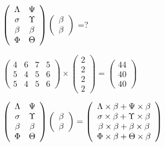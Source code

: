 \documentclass[12pt]{article}
\begin{document}
 
$  %
 \left( \begin{array}
 {
 c
 c
 }
 \Lambda & 
 \Psi \\ 
 \sigma & 
 \Upsilon \\ 
 \beta & 
 \beta \\ 
 \Phi & 
 \Theta
 \end{array} \right)
 \left( \begin{array}
 {
 c
 }
 \beta \\ 
 \beta
 \end{array} \right)
$ =?
 
 
 
\noindent{}
 
 

 
$\left( \begin{array}{ccccccccccccccc}
           4  & 
           6  & 
           7  & 
           5  \\ 
           5  & 
           4  & 
           5  & 
           6  \\ 
           5  & 
           4  & 
           5  & 
           6
\end{array}\right) \times
\left( \begin{array}{c}
           2  \\ 
           2  \\ 
           2  \\ 
           2
\end{array}\right)  =
\left( \begin{array}{c}
          44  \\ 
          40  \\ 
          40
\end{array}\right)  $
 
$  %
 \left( \begin{array}
 {
 c
 c
 }
 \Lambda & 
 \Psi \\ 
 \sigma & 
 \Upsilon \\ 
 \beta & 
 \beta \\ 
 \Phi & 
 \Theta
 \end{array} \right)
 \left( \begin{array}
 {
 c
 }
 \beta \\ 
 \beta
 \end{array} \right)
=
 \left( \begin{array}
 {
 c
 }
  \Lambda \times  \beta +  \Psi \times  \beta \\ 
  \sigma \times  \beta +  \Upsilon \times  \beta \\ 
  \beta \times  \beta +  \beta \times  \beta \\ 
  \Phi \times  \beta +  \Theta \times  \beta
 \end{array} \right)
$
 
\end{document}
